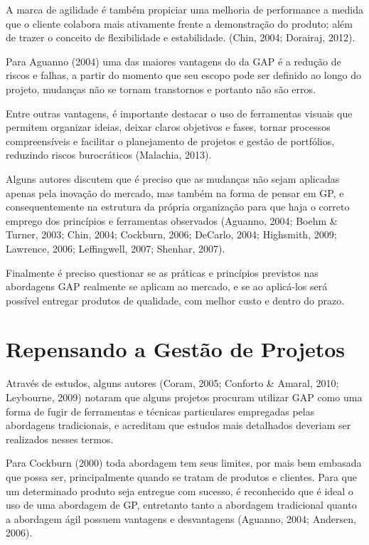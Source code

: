  A marca de agilidade é também propiciar uma melhoria de performance a medida que o cliente colabora mais ativamente frente a demonstração do produto; além de trazer o conceito de flexibilidade e estabilidade. (Chin, 2004; Dorairaj, 2012).

Para Aguanno (2004) uma das maiores vantagens do da GAP é a redução de riscos e falhas, a partir do momento que seu escopo pode ser definido ao longo do projeto, mudanças não se tornam transtornos e portanto não são erros.

Entre outras vantagens, é importante destacar o uso de ferramentas visuais que permitem organizar ideias, deixar claros objetivos e fases, tornar processos compreensíveis e facilitar o planejamento de projetos e gestão de portfólios, reduzindo riscos burocráticos (Malachia, 2013).

Alguns autores discutem que é preciso que as mudanças não sejam aplicadas apenas pela inovação do mercado, mas também na forma de pensar em GP, e consequentemente na estrutura da própria organização para que haja o correto emprego dos princípios e ferramentas observados (Aguanno, 2004; Boehm \& Turner, 2003; Chin, 2004; Cockburn, 2006; DeCarlo, 2004; Highsmith, 2009; Lawrence, 2006; Leffingwell, 2007; Shenhar, 2007).

Finalmente é preciso questionar se as práticas e princípios previstos nas abordagens GAP realmente se aplicam ao mercado, e se ao aplicá-los será possível entregar produtos de qualidade, com melhor custo e dentro do prazo.

\section{Repensando a Gestão de Projetos}

Através de estudos, alguns autores (Coram, 2005; Conforto \& Amaral, 2010; Leybourne, 2009) notaram que alguns projetos procuram utilizar GAP como uma forma de fugir de ferramentas e técnicas particulares empregadas pelas abordagens tradicionais, e acreditam que estudos mais detalhados deveriam ser realizados nesses termos.

Para Cockburn (2000) toda abordagem tem seus limites, por mais bem embasada que possa ser, principalmente quando se tratam de produtos e clientes. Para que um determinado produto seja entregue com sucesso, é reconhecido que é ideal o uso de uma abordagem de GP, entretanto tanto a abordagem tradicional quanto a abordagem ágil possuem vantagens e desvantagens (Aguanno, 2004; Andersen, 2006).

